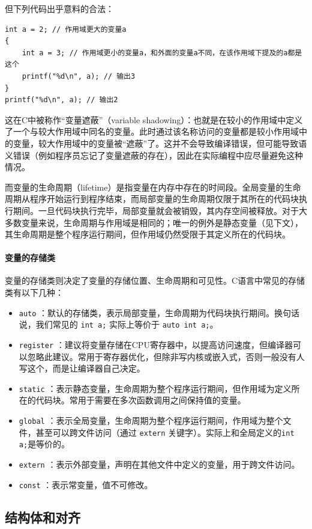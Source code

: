 但下列代码出乎意料的合法：
\begin{verbatim}
int a = 2; // 作用域更大的变量a
{
    int a = 3; // 作用域更小的变量a，和外面的变量a不同，在该作用域下提及的a都是这个
    printf("%d\n", a); // 输出3
}
printf("%d\n", a); // 输出2
\end{verbatim}
这在C中被称作“变量遮蔽”（variable shadowing）：也就是在较小的作用域中定义了一个与较大作用域中同名的变量。此时通过该名称访问的变量都是较小作用域中的变量，较大作用域中的变量被“遮蔽”了。这并不会导致编译错误，但可能导致语义错误（例如程序员忘记了变量遮蔽的存在），因此在实际编程中应尽量避免这种情况。

而变量的生命周期（lifetime）是指变量在内存中存在的时间段。全局变量的生命周期从程序开始运行到程序结束，而局部变量的生命周期仅限于其所在的代码块执行期间。一旦代码块执行完毕，局部变量就会被销毁，其内存空间被释放。对于大多数变量来说，生命周期与作用域是相同的；唯一的例外是静态变量（见下文），其生命周期是整个程序运行期间，但作用域仍然受限于其定义所在的代码块。

\paragraph{变量的存储类}

变量的存储类则决定了变量的存储位置、生命周期和可见性。C语言中常见的存储类有以下几种：
\begin{itemize}
  \item \texttt{auto} ：默认的存储类，表示局部变量，生命周期为代码块执行期间。换句话说，我们常见的 \verb|int a;| 实际上等价于 \verb|auto int a;|。
  \item \texttt{register} ：建议将变量存储在CPU寄存器中，以提高访问速度，但编译器可以忽略此建议。常用于寄存器优化，但除非写内核或嵌入式，否则一般没有人写这个，而是让编译器自己决定。
  \item \texttt{static} ：表示静态变量，生命周期为整个程序运行期间，但作用域为定义所在的代码块。常用于需要在多次函数调用之间保持值的变量。
  \item \texttt{global} ：表示全局变量，生命周期为整个程序运行期间，作用域为整个文件，甚至可以跨文件访问（通过 \texttt{extern} 关键字）。实际上和全局定义的\verb|int a;|是等价的。
  \item \texttt{extern} ：表示外部变量，声明在其他文件中定义的变量，用于跨文件访问。
  \item \texttt{const} ：表示常变量，值不可修改。
\end{itemize}

\subsection{结构体和对齐}

